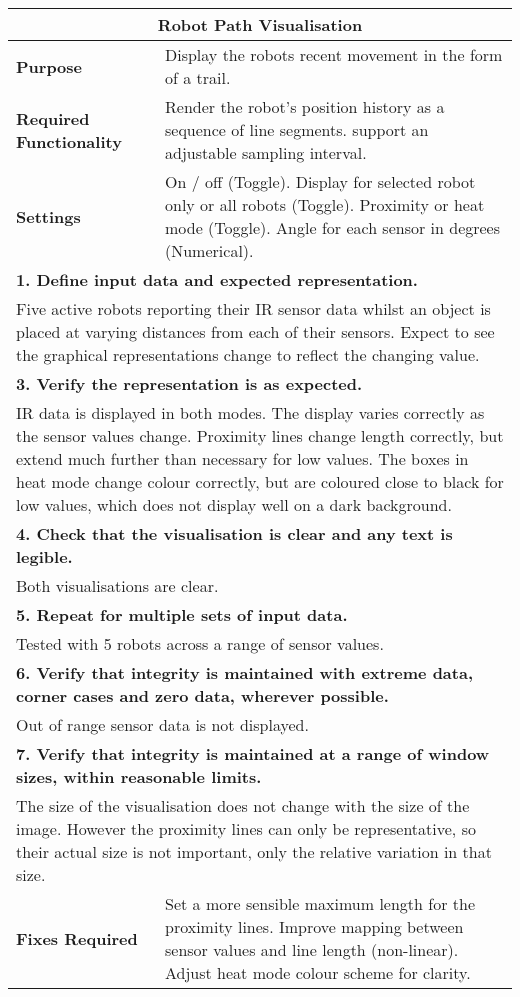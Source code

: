\begin{longtable}{ l p{10cm} }
 \hline
 \multicolumn{2}{c}{\textbf{Robot Path Visualisation}}\\
 \hline
 \textbf{Purpose} & Display the robots recent movement in the form of a trail.\\
 \textbf{Required Functionality} & Render the robot's position history as a sequence of line segments. support an adjustable sampling interval.\\
 \textbf{Settings} & On / off (Toggle). Display for selected robot only or all robots (Toggle). Proximity or heat mode (Toggle). Angle for each sensor in degrees (Numerical).\\
 \hline
 \multicolumn{2}{p{14cm}}{\textbf{1. Define input data and expected representation.}}\\
 \multicolumn{2}{p{14cm}}{Five active robots reporting their IR sensor data whilst an object is placed at varying distances from each of their sensors. Expect to see the graphical representations change to reflect the changing value.}\\
 \hline
 \multicolumn{2}{p{14cm}}{\textbf{3. Verify the representation is as expected.}}\\
 \multicolumn{2}{p{14cm}}{IR data is displayed in both modes. The display varies correctly as the sensor values change. Proximity lines change length correctly, but extend much further than necessary for low values. The boxes in heat mode change colour correctly, but are coloured close to black for low values, which does not display well on a dark background.}\\
 \hline
 \multicolumn{2}{p{14cm}}{\textbf{4. Check that the visualisation is clear and any text is legible.}}\\
 \multicolumn{2}{p{14cm}}{Both visualisations are clear.}\\
 \hline
 \multicolumn{2}{p{14cm}}{\textbf{5. Repeat for multiple sets of input data.}}\\
 \multicolumn{2}{p{14cm}}{Tested with 5 robots across a range of sensor values.}\\
 \hline
 \multicolumn{2}{p{14cm}}{\textbf{6. Verify that integrity is maintained with extreme data, corner cases and zero data, wherever possible.}}\\
 \multicolumn{2}{p{14cm}}{Out of range sensor data is not displayed.}\\
 \hline
 \multicolumn{2}{p{14cm}}{\textbf{7. Verify that integrity is maintained at a range of window sizes, within reasonable limits.}}\\
 \multicolumn{2}{p{14cm}}{The size of the visualisation does not change with the size of the image. However the proximity lines can only be representative, so their actual size is not important, only the relative variation in that size.}\\
 \hline
 \textbf{Fixes Required} & Set a more sensible maximum length for the proximity lines. Improve mapping between sensor values and line length (non-linear). Adjust heat mode colour scheme for clarity.\\
 \bottomrule
\end{longtable}
\clearpage



